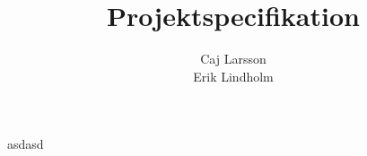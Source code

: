 \documentclass[a4paper,8pt]{article}
\begin{document}
\title{Projektspecifikation}
\author{Caj Larsson\\Erik Lindholm}\maketitle


asdasd
\end{document}
